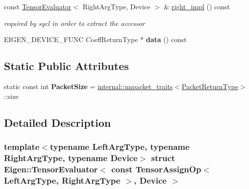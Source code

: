 \begin{DoxyCompactItemize}
const \hyperlink{struct_eigen_1_1_tensor_evaluator}{Tensor\+Evaluator}$<$ Right\+Arg\+Type, Device $>$ \& \hyperlink{struct_eigen_1_1_tensor_evaluator_3_01const_01_tensor_assign_op_3_01_left_arg_type_00_01_right_arg_type_01_4_00_01_device_01_4_aeb9deae6affa88fe857daf66d83e38a0}{right\+\_\+impl} () const
\begin{DoxyCompactList}\small\item\em required by sycl in order to extract the accessor \end{DoxyCompactList}\item 
\mbox{\label{struct_eigen_1_1_tensor_evaluator_3_01const_01_tensor_assign_op_3_01_left_arg_type_00_01_right_arg_type_01_4_00_01_device_01_4_a5ae71f08cd8ccd2f9f677e518d40bfd5}} 
E\+I\+G\+E\+N\+\_\+\+D\+E\+V\+I\+C\+E\+\_\+\+F\+U\+NC Coeff\+Return\+Type $\ast$ {\bfseries data} () const
\end{DoxyCompactItemize}
\subsection*{Static Public Attributes}
\begin{DoxyCompactItemize}
\item 
\mbox{\label{struct_eigen_1_1_tensor_evaluator_3_01const_01_tensor_assign_op_3_01_left_arg_type_00_01_right_arg_type_01_4_00_01_device_01_4_aec86617f1bf5eee1878d5aeb5c846379}} 
static const int {\bfseries Packet\+Size} = \hyperlink{struct_eigen_1_1internal_1_1unpacket__traits}{internal\+::unpacket\+\_\+traits}$<$\hyperlink{group___sparse_core___module}{Packet\+Return\+Type}$>$\+::size
\end{DoxyCompactItemize}


\subsection{Detailed Description}
\subsubsection*{template$<$typename Left\+Arg\+Type, typename Right\+Arg\+Type, typename Device$>$\newline
struct Eigen\+::\+Tensor\+Evaluator$<$ const Tensor\+Assign\+Op$<$ Left\+Arg\+Type, Right\+Arg\+Type $>$, Device $>$}



